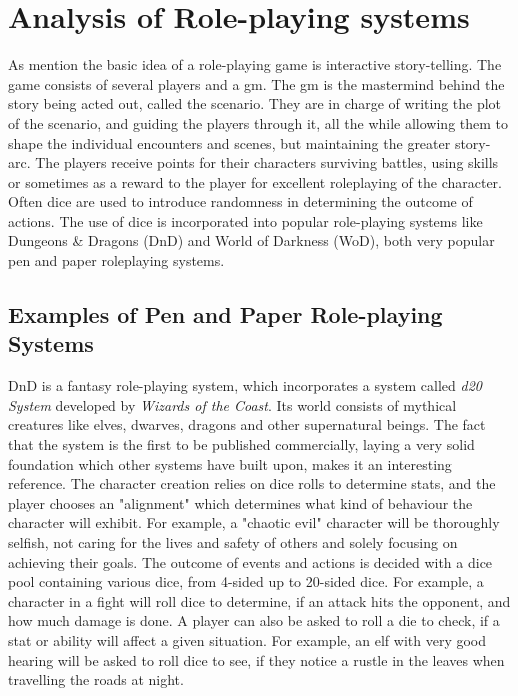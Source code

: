 \section{Analysis of Role-playing systems}

As mention the basic idea of a role-playing game is interactive story-telling. The game consists of several players and a \ac{gm}. The \ac{gm} is the mastermind behind the story being acted out, called the scenario. They are in charge of writing the plot of the scenario, and guiding the players through it, all the while allowing them to shape the individual encounters and scenes, but maintaining the greater story-arc. The players receive points for their characters surviving battles, using skills or sometimes as a reward to the player for excellent roleplaying of the character. Often dice are used to introduce randomness in determining the outcome of actions. The use of dice is incorporated into popular role-playing systems like Dungeons \& Dragons (DnD) and World of Darkness (WoD), both very popular pen and paper roleplaying systems.


\subsection{Examples of Pen and Paper Role-playing Systems}

DnD is a fantasy role-playing system, which incorporates a system called \emph{d20 System} developed by \emph{Wizards of the Coast}.
Its world consists of mythical creatures like elves, dwarves, dragons and other supernatural beings. The fact that the system is the first to be published commercially, laying a very solid foundation which other systems have built upon, makes it an interesting reference. The character creation relies on dice rolls to determine stats, and the player chooses an "alignment" which determines what kind of behaviour the character will exhibit. For example, a "chaotic evil" character will be thoroughly selfish, not caring for the lives and safety of others and solely focusing on achieving their goals.
The outcome of events and actions is decided with a dice pool containing various dice, from 4-sided up to 20-sided dice. For example, a character in a fight will roll dice to determine, if an attack hits the opponent, and how much damage is done. A player can also be asked to roll a die to check, if a stat or ability will affect a given situation. For example, an elf with very good hearing will be asked to roll dice to see, if they notice a rustle in the leaves when travelling the roads at night.\cite{dnd}

